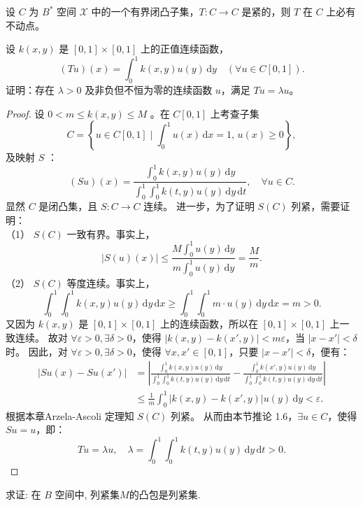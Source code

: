 \documentclass[lang=cn,newtx,10pt,scheme=chinese,thmcnt=chapter]{elegantbook}
\newcommand{\dif}{\mathrm{d}}
\begin{document}
\begin{corollary}
设 \(C\) 为 \(B^*\) 空间 \(\mathscr{X}\) 中的一个有界闭凸子集，\(T: C \rightarrow C\) 是紧的，则 \(T\) 在 \(C\) 上必有不动点。
\end{corollary}
\begin{example}
设 $k(x, y)$ 是 $[0,1] \times [0,1]$ 上的正值连续函数，
\[
(T u)(x) = \int_0^1 k(x, y) u(y) \, \dif y \quad (\forall u \in C[0,1]) .
\]
证明：存在 $\lambda > 0$ 及非负但不恒为零的连续函数 $u$，满足 $T u = \lambda u$。
\end{example}
\begin{proof}
设 $0 < m \leqslant k(x, y) \leqslant M$ 。在 $C[0,1]$ 上考查子集
\[
C=\left\{ u \in C[0,1] \mid \int_0^1 u(x) \, \dif x = 1, \, u(x) \geqslant 0 \right\} ,
\]
及映射 $S$ ：
\[
(S u)(x) = \frac{\int_0^1 k(x, y) u(y) \, \dif y}{\int_0^1 \int_0^1 k(t, y) u(y) \, \dif y \, \dif t}, \quad \forall u \in C .
\]
显然 $C$ 是闭凸集，且 $S: C \to C$ 连续。  进一步，为了证明 $S(C)$ 列紧，需要证明：\\
（1） $S(C)$ 一致有界。事实上，
\[
|S(u)(x)| \leqslant \frac{M \int_0^1 u(y) \, \dif y}{m \int_0^1 u(y) \, \dif y} = \frac{M}{m} .
\]
（2） $S(C)$ 等度连续。事实上，
\[
\int_0^1 \int_0^1 k(x, y) u(y) \, \dif y \, \dif x \geqslant \int_0^1 \int_0^1 m \cdot u(y) \,\dif y \, \dif x = m > 0 .
\]
又因为 $k(x, y)$ 是 $[0,1] \times [0,1]$ 上的连续函数，所以在 $[0,1] \times [0,1]$ 上一致连续。  
故对 $\forall \varepsilon > 0, \exists \delta > 0$，使得 $\left|k(x, y) - k(x', y)\right| < m \varepsilon$，当 $\left|x - x'\right| < \delta$ 时。  
因此，对 $\forall \varepsilon > 0, \exists \delta > 0$，使得 $\forall x, x' \in [0,1]$，只要 $\left|x - x'\right| < \delta$，便有：
\[
\begin{aligned}
|S u(x) - S u(x')| &= \left| \frac{\int_0^1 k(x, y) u(y) \, \dif y}{\int_0^1 \int_0^1 k(t, y) u(y) \, \dif y \, \dif t} - \frac{\int_0^1 k(x', y) u(y) \, \dif y}{\int_0^1 \int_0^1 k(t, y) u(y) \, \dif y \, \dif t} \right| \\
&\leqslant \frac{1}{m} \int_0^1 \left| k(x, y) - k(x', y) \right| u(y) \, \dif y < \varepsilon .
\end{aligned}
\]
根据本章Arzela-Ascoli 定理知 $S(C)$ 列紧。  从而由本节推论 1.6，$\exists u \in C$，使得 $S u = u$，即：
\[
T u = \lambda u, \quad \lambda = \int_0^1 \int_0^1 k(t, y) u(y) \, \dif y \, \dif t > 0 .
\]
\end{proof}
\begin{example}
求证: 在 $B$ 空间中, 列紧集$M$的凸包是列紧集.
\end{example}
\end{document}
